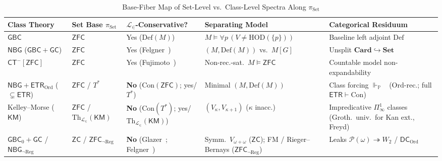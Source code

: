 \begin{table}[htbp]
\centering
\caption{Base-Fiber Map of Set-Level vs.\ Class-Level Spectra Along $\pi_{\mathrm{Set}}$}\label{tab:fibration-map}
\vspace{0.3em}
{\scriptsize\setlength{\tabcolsep}{2.5pt}\renewcommand{\arraystretch}{1.12}%
\begin{tabularx}{\textwidth}{@{}P{0.18\textwidth}P{0.12\textwidth}P{0.17\textwidth}YY@{}}
\toprule
\textbf{Class Theory} & \textbf{Set Base $\pi_{\mathrm{Set}}$} & \textbf{$\mathcal{L}_\in$-Conservative?} & \textbf{Separating Model} & \textbf{Categorical Residuum} \\
\midrule
$\mathsf{GBC}$ & $\mathsf{ZFC}$ & Yes ($\mathrm{Def}(M)$) & $M \models \forall p\,(V \neq \mathrm{HOD}(\{p\}))$ & Baseline left adjoint $\mathrm{Def}$ \\
$\mathsf{NBG}$ ($\mathsf{GBC}+\mathsf{GC}$) & $\mathsf{ZFC}$ & Yes (Felgner~\cite{Felgner71}) & $(M,\mathrm{Def}(M))$ vs.\ $M[G]$ & Unsplit $\mathbf{Card} \hookrightarrow \mathbf{Set}$ \\
$\mathsf{CT}^-[\mathsf{ZFC}]$ & $\mathsf{ZFC}$ & Yes (Fujimoto~\cite{Fujimoto12}) & Non-rec.-sat.\ $M \models \mathsf{ZFC}$ & Countable model non-expandability \\
$\mathsf{NBG}+\mathsf{ETR}_{\mathrm{Ord}}$ ($\subsetneq \mathsf{ETR}$) & $\mathsf{ZFC}$ / $T^*$ & \textbf{No} ($\mathrm{Con}(\mathsf{ZFC})$; yes/$T^*$) & Minimal $(M,\mathrm{Def}(M))$ & Class forcing $\Vdash_{\mathbb{P}}$~\cite[Thm.~1.2]{Gitman20} ($\mathrm{Ord}$-rec.; full $\mathsf{ETR} \vdash \mathrm{Con}$) \\
Kelley--Morse ($\mathsf{KM}$) & $\mathsf{ZFC}$ / $\mathrm{Th}_{\mathcal{L}_\in}(\mathsf{KM})$ & \textbf{No} ($\mathrm{Con}(T^*)$; yes/$\mathrm{Th}_{\mathcal{L}_\in}(\mathsf{KM})$) & $(V_\kappa, V_{\kappa+1})$ ($\kappa$ inacc.) & Impredicative $\Pi^1_\infty$ classes (Groth.\ univ.\ for Kan ext., Freyd) \\
$\mathsf{GBC}_0+\mathsf{GC}$ / $\mathsf{NBG}_{\neg\mathrm{Reg}}$ & $\mathsf{ZC}$ / $\mathsf{ZFC}_{\neg\mathrm{Reg}}$ & \textbf{No} (Glazer~\cite{Glazer23}; Felgner~\cite{Felgner76}) & Symm.\ $V_{\omega+\omega}$ ($\mathsf{ZC}$); FM / Rieger--Bernays ($\mathsf{ZFC}_{\neg\mathrm{Reg}}$) & Leaks $\mathcal{P}(\omega)\twoheadrightarrow W_2$ / $\mathsf{DC}_{\mathrm{Ord}}$ \\
\bottomrule
\end{tabularx}\par}
\end{table}

